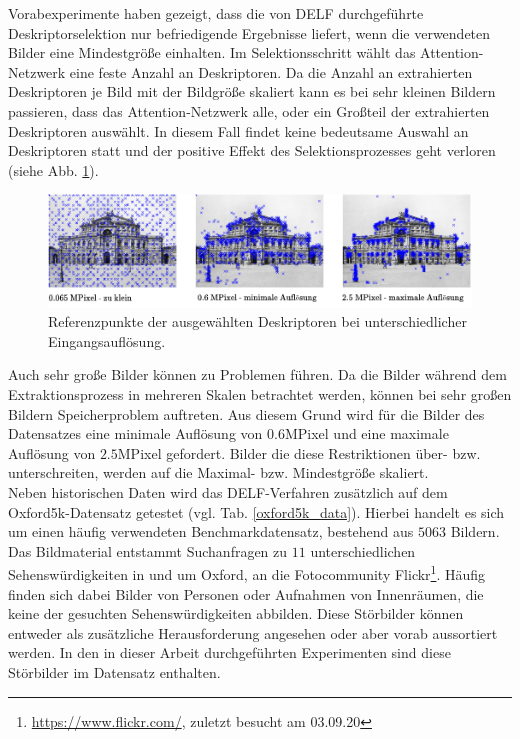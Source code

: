 Vorabexperimente haben gezeigt, dass die von DELF durchgeführte Deskriptorselektion nur befriedigende Ergebnisse liefert, wenn die verwendeten Bilder eine Mindestgröße einhalten. Im Selektionsschritt wählt das Attention-Netzwerk eine feste Anzahl an Deskriptoren. Da die Anzahl an extrahierten Deskriptoren je Bild mit der Bildgröße skaliert kann es bei sehr kleinen Bildern passieren, dass das Attention-Netzwerk alle, oder ein Großteil der extrahierten Deskriptoren auswählt. In diesem Fall findet keine bedeutsame Auswahl an Deskriptoren statt und der positive Effekt des Selektionsprozesses geht verloren (siehe Abb. \ref{small_img}).
\begin{figure}[h]
\includegraphics[scale=0.955]{scale_descriptor_selection.pdf}
\caption{Referenzpunkte der ausgewählten Deskriptoren bei unterschiedlicher Eingangsauflösung.}
\label{small_img}
\end{figure}
Auch sehr große Bilder können zu Problemen führen. Da die Bilder während dem Extraktionsprozess in mehreren Skalen betrachtet werden, können bei sehr großen Bildern Speicherproblem auftreten. Aus diesem Grund wird für die Bilder des Datensatzes eine minimale Auflösung von $0.6$MPixel und eine maximale Auflösung von $2.5$MPixel gefordert. Bilder die diese Restriktionen über- bzw. unterschreiten, werden auf die Maximal- bzw. Mindestgröße skaliert.\\
Neben historischen Daten wird das DELF-Verfahren zusätzlich auf dem Oxford5k-Datensatz \cite{oxford5k} getestet (vgl. Tab. \ref{oxford5k_data}). Hierbei handelt es sich um einen häufig verwendeten Benchmarkdatensatz, bestehend aus $5063$ Bildern. Das Bildmaterial entstammt Suchanfragen zu $11$ unterschiedlichen Sehenswürdigkeiten in und um Oxford, an die Fotocommunity Flickr\footnote{\url{https://www.flickr.com/}, zuletzt besucht am 03.09.20}. Häufig finden sich dabei Bilder von Personen oder Aufnahmen von Innenräumen, die keine der gesuchten Sehenswürdigkeiten abbilden. Diese Störbilder können entweder als zusätzliche Herausforderung angesehen oder aber vorab aussortiert werden. In den in dieser Arbeit durchgeführten Experimenten sind diese Störbilder im Datensatz enthalten. 
